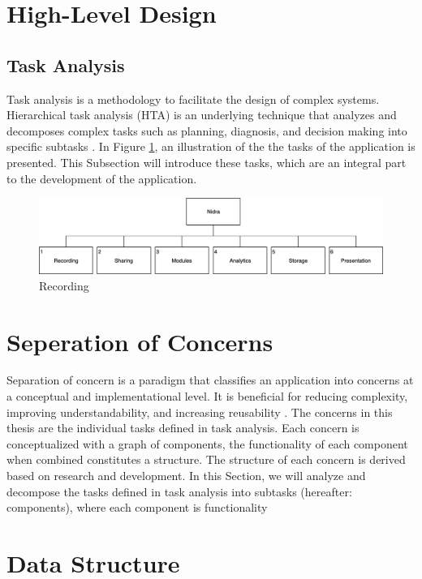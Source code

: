

\section{High-Level Design}

\subsection{Task Analysis}
Task analysis is a methodology to facilitate the design of complex systems. Hierarchical task analysis (HTA) is an underlying technique that analyzes and decomposes complex tasks such as planning, diagnosis, and decision making into specific subtasks \cite{ta}. In Figure \ref{fig:hta_overview}, an illustration of the the tasks of the application is presented. This Subsection will introduce these tasks, which are an integral part to the development of the application.

\begin{figure}
    \centering
    \includegraphics[scale=0.23]{images/TA.png}
    \caption{Recording}
    \label{fig:hta_overview}
\end{figure}



\section{Seperation of Concerns}
Separation of concern is a paradigm that classifies an application into concerns at a conceptual and implementational level. It is beneficial for reducing complexity, improving understandability, and increasing reusability \cite{soc}. The concerns in this thesis are the individual tasks defined in task analysis. Each concern is conceptualized with a graph of components, the functionality of each component when combined constitutes a structure. The structure of each concern is derived based on research and development. In this Section, we will analyze and decompose the tasks defined in task analysis into subtasks (hereafter: components), where each component is functionality   



\section{Data Structure}

